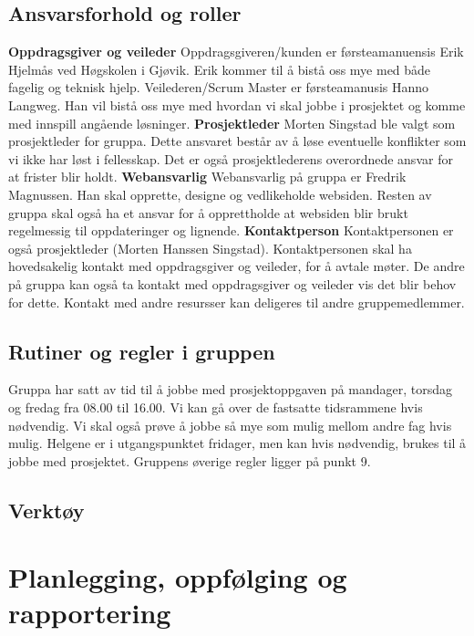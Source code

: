 \documentclass[12pt,a4paper]{article}
\begin{document}
\subsection{Ansvarsforhold og roller}
\textbf{Oppdragsgiver og veileder}
Oppdragsgiveren/kunden er førsteamanuensis Erik Hjelmås ved Høgskolen i Gjøvik. Erik kommer til å bistå oss mye med både fagelig og teknisk hjelp. Veilederen/Scrum Master er førsteamanusis Hanno Langweg. Han vil bistå oss mye med hvordan vi skal jobbe i prosjektet og komme med innspill angående løsninger. \newline
\textbf{Prosjektleder}
Morten Singstad ble valgt som prosjektleder for gruppa. Dette ansvaret består av å løse eventuelle konflikter som vi ikke har løst i fellesskap. Det er også prosjektlederens overordnede ansvar for at frister blir holdt. \newline
\textbf{Webansvarlig}
Webansvarlig på gruppa er Fredrik Magnussen. Han skal opprette, designe og vedlikeholde websiden. Resten av gruppa skal også ha et ansvar for å opprettholde at websiden blir brukt regelmessig til oppdateringer og lignende. \newline
\textbf{Kontaktperson}
Kontaktpersonen er også prosjektleder (Morten Hanssen Singstad). Kontaktpersonen skal ha hovedsakelig kontakt med oppdragsgiver og veileder, for å avtale møter. De andre på gruppa kan også ta kontakt med oppdragsgiver og veileder vis det blir behov for dette. Kontakt med andre resursser kan deligeres til andre gruppemedlemmer.

\subsection{Rutiner og regler i gruppen}
Gruppa har satt av tid til å jobbe med prosjektoppgaven på mandager, torsdag og fredag fra 08.00 til 16.00. Vi kan gå over de fastsatte tidsrammene hvis nødvendig. Vi skal også prøve å jobbe så mye som mulig mellom andre fag hvis mulig. Helgene er i utgangspunktet fridager, men kan hvis nødvendig, brukes til å jobbe med prosjektet. Gruppens øverige regler ligger på punkt 9.

\subsection{Verktøy}

\section{Planlegging, oppfølging og rapportering}
\end{document}
